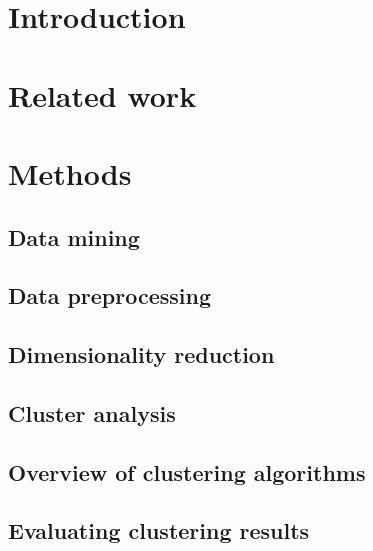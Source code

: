 \section{Introduction}
\label{section:Introduction}



\section{Related work}
\label{section:RelatedWork}



\section{Methods}
\label{section:Theory}

  \subsection{Data mining}
  \label{section:TheoryDataMining}
  
    
  \subsection{Data preprocessing}
  \label{section:TheoryDataPreprocessing}
  

  \subsection{Dimensionality reduction}
  \label{section:TheoryDimensionalityReduction}
  
  
  \subsection{Cluster analysis}
  \label{section:TheoryClusterAnalysis}
  

  \subsection{Overview of clustering algorithms}
  \label{section:TheoryOverviewClusteringAlgorithms}
  

  \subsection{Evaluating clustering results}
  \label{section:TheoryEvaluatingClusteringResults}
  



